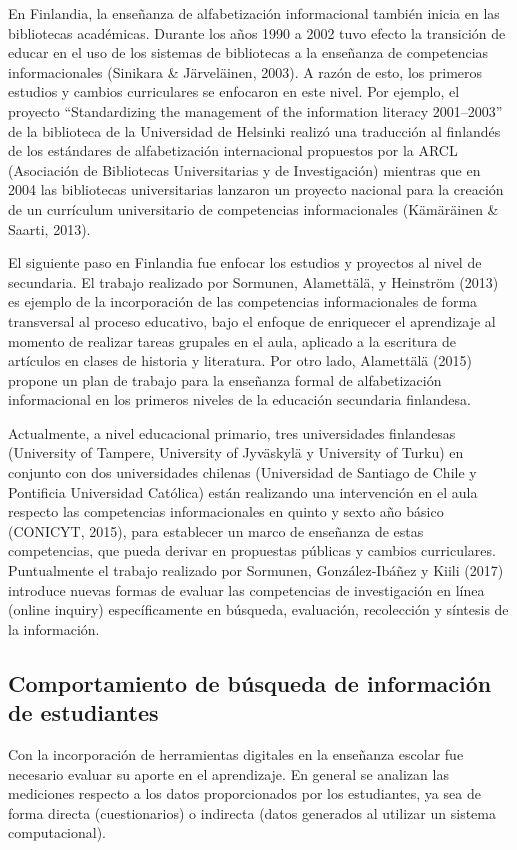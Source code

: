 En Finlandia, la enseñanza de alfabetización informacional también inicia en las bibliotecas académicas. Durante los años 1990 a 2002 tuvo efecto la transición de educar en el uso de los sistemas de bibliotecas a la enseñanza de competencias informacionales (Sinikara & Järveläinen, 2003). A razón de esto, los primeros estudios y cambios curriculares se enfocaron en este nivel. Por ejemplo, el proyecto “Standardizing the management of the information literacy 2001–2003” de la biblioteca de la Universidad de Helsinki realizó una traducción al finlandés de los estándares de alfabetización internacional propuestos por la ARCL (Asociación de Bibliotecas Universitarias y de Investigación) mientras que en 2004 las bibliotecas universitarias lanzaron un proyecto nacional para la creación de un currículum universitario de competencias informacionales (Kämäräinen & Saarti, 2013).

El siguiente paso en Finlandia fue enfocar los estudios y proyectos al nivel de secundaria. El trabajo realizado por Sormunen, Alamettälä, y Heinström (2013) es ejemplo de la incorporación de las competencias informacionales de forma transversal al proceso educativo, bajo el enfoque de enriquecer el aprendizaje al momento de realizar tareas grupales en el aula, aplicado a la escritura de artículos en clases de historia y literatura. Por otro lado, Alamettälä (2015) propone un plan de trabajo para la enseñanza formal de alfabetización informacional en los primeros niveles de la educación secundaria finlandesa.  

Actualmente, a nivel educacional primario, tres universidades finlandesas (University of Tampere, University of Jyväskylä y University of Turku) en conjunto con dos universidades chilenas (Universidad de Santiago de Chile y Pontificia Universidad Católica) están realizando una intervención en el aula respecto las competencias informacionales en quinto y sexto año básico (CONICYT, 2015), para establecer un marco de enseñanza de estas competencias, que pueda derivar en propuestas públicas y cambios curriculares. Puntualmente el trabajo realizado por Sormunen, González-Ibáñez y Kiili (2017) introduce nuevas formas de evaluar las competencias de investigación en línea (online inquiry) específicamente en búsqueda, evaluación, recolección y síntesis de la información.

\subsection{Comportamiento de búsqueda de información de estudiantes}
Con la incorporación de herramientas digitales en la enseñanza escolar fue necesario evaluar su aporte en el aprendizaje. En general se analizan las mediciones respecto a los datos proporcionados por los estudiantes, ya sea de forma directa (cuestionarios) o indirecta (datos generados al utilizar un sistema computacional).

